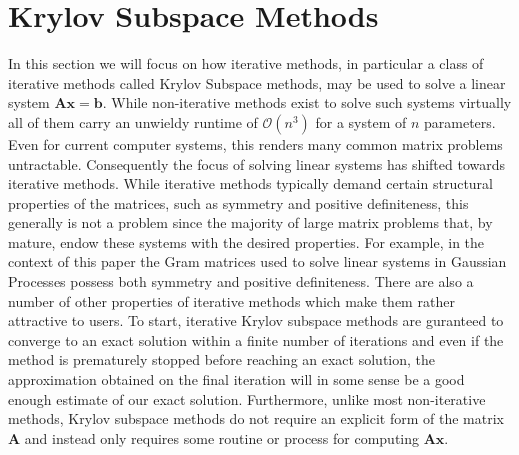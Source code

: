 \section{Krylov Subspace Methods}\label{Chapter4}
In this section we will focus on how iterative methods, in particular a class of iterative methods called Krylov Subspace methods, may be used to solve a linear system $\bm{A} \bm{x} = \bm{b}$. While non-iterative methods exist to solve such systems virtually all of them carry an unwieldy runtime of $\mathcal{O} \left( n^3 \right)$ for a system of $n$ parameters. Even for current computer systems, this renders many common matrix problems untractable. Consequently the focus of solving linear systems has shifted towards iterative methods. While iterative methods typically demand certain structural properties of the matrices, such as symmetry and positive definiteness, this generally is not a problem since the majority of large matrix problems that, by mature, endow these systems with the desired properties. For example, in the context of this paper the Gram matrices used to solve linear systems in Gaussian Processes possess both symmetry and positive definiteness. There are also a number of other properties of iterative methods which make them rather attractive to users. To start, iterative Krylov subspace methods are guranteed to converge to an exact solution within a finite number of iterations and even if the method is prematurely stopped before reaching an exact solution, the approximation obtained on the final iteration will in some sense be a good enough estimate of our exact solution. Furthermore, unlike most non-iterative methods, Krylov subspace methods do not require an explicit form of the matrix $\bm{A}$ and instead only requires some routine or process for computing $\bm{A} \bm{x}$.










